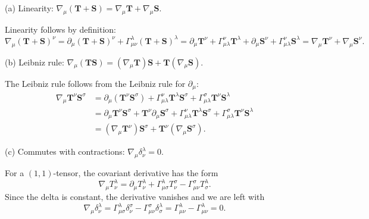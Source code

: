 \documentclass{../../templates/lkx_pset}
\begin{document}
\begin{parts}
	\begin{part}{(a)}
		Linearity: $\nabla_\mu (\mathbf{T} + \mathbf{S}) = \nabla_\mu \mathbf{T} + \nabla_\mu\mathbf{S}$.
	\end{part}
	Linearity follows by definition:
	\[
		\nabla_\mu (\mathbf{T} + \mathbf{S})^\nu = \partial_\mu (\mathbf{T} +\mathbf{S})^\nu +\Gamma^\lambda_{\mu\nu} (\mathbf{T}+\mathbf{S})^\lambda =
		\partial_\mu\mathbf{T}^\nu + \Gamma^\nu_{\mu\lambda}\mathbf{T}^\lambda +
		\partial_\mu\mathbf{S}^\nu + \Gamma^\nu_{\mu\lambda}\mathbf{S}^\lambda
		= \nabla_\mu \mathbf{T}^\nu + \nabla_\mu\mathbf{S}^\nu.
	\]

	\begin{part}{(b)}
		Leibniz rule: $\nabla_\mu (\mathbf{T}\mathbf{S}) = (\nabla_\mu \mathbf{T})\mathbf{S} + \mathbf{T}(\nabla_\mu\mathbf{S})$.
	\end{part}
	The Leibniz rule follows from the Leibniz rule for $\partial_\mu$:
	\[
		\begin{aligned}
			\nabla_\mu \mathbf{T}^\nu\mathbf{S}^\sigma
			 & =
			\partial_\mu(\mathbf{T}^\nu\mathbf{S}^\sigma) +
			\Gamma^\nu_{\mu\lambda} \mathbf{T}^\lambda\mathbf{S}^\sigma
			+\Gamma^\sigma_{\mu\lambda} \mathbf{T}^\nu\mathbf{S}^\lambda                                     \\
			 & =
			\partial_\mu\mathbf{T}^\nu\mathbf{S}^\sigma + \mathbf{T}^\nu\partial_\mu\mathbf{S}^\sigma+
			\Gamma^\nu_{\mu\lambda} \mathbf{T}^\lambda\mathbf{S}^\sigma
			+\Gamma^\sigma_{\mu\lambda} \mathbf{T}^\nu\mathbf{S}^\lambda                                     \\
			 & = (\nabla_\mu \mathbf{T}^\nu)\mathbf{S}^\sigma + \mathbf{T}^\nu(\nabla_\mu\mathbf{S}^\sigma).
		\end{aligned}
	\]

	\begin{part}{(c)}
		Commutes with contractions: $\nabla_\mu \delta_\nu^\lambda = 0$.
	\end{part}

	For a $(1,1)$-tensor, the covariant derivative has the form
	\[
		\nabla_\mu T^\lambda_\nu = \partial_\mu T^\lambda_\nu + \Gamma^\lambda_{\mu\sigma} T^\sigma_\nu - \Gamma^\sigma_{\mu\nu} T^\lambda_\sigma.
	\]
	Since the delta is constant, the derivative vanishes and we are left with
	\[
		\nabla_\mu \delta^\lambda_\nu = \Gamma^\lambda_{\mu\sigma} \delta^\sigma_\nu - \Gamma^\sigma_{\mu\nu}\delta^\lambda_\sigma = \Gamma^\lambda_{\mu\nu} - \Gamma^\lambda_{\mu\nu} = 0.
	\]


\end{parts}
\end{document}
